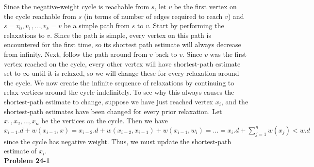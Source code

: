 \documentclass{article}
\begin{document}
Since the negative-weight cycle is reachable from $s$, let $v$ be the first vertex on the cycle reachable from $s$ (in terms of number of edges required to reach $v$) and $s = v_0, v_1, \ldots, v_k = v$ be a simple path from $s$ to $v$.  Start by performing the relaxations to $v$. Since the path is simple, every vertex on this path is encountered for the first time, so its shortest path estimate will always decrease from infinity.  Next, follow the path around from $v$ back to $v$.  Since $v$ was the first vertex reached on the cycle, every other vertex will have shortest-path estimate set to $\infty$ until it is relaxed, so we will change these for every relaxation around the cycle.  We now create the infinite sequence of relaxations by continuing to relax vertices around the cycle indefinitely. To see why this always causes the shortest-path estimate to change, suppose we have just reached vertex $x_i$, and the shortest-path estimates have been changed for every prior relaxation.  Let $x_1, x_2, \ldots, x_n$ be the vertices on the cycle. Then we have $x_{i-1}.d + w(x_{i-1}, x) = x_{i-2}.d + w(x_{i-2}, x_{i-1}) + w(x_{i-1}, w_i) = \ldots = x_i.d + \sum_{j=1}^n w(x_j) < w.d$ since the cycle has negative weight.  Thus, we must update the shortest-path estimate of $x_i$.\\


\noindent\textbf{Problem 24-1}\\
\end{document}
